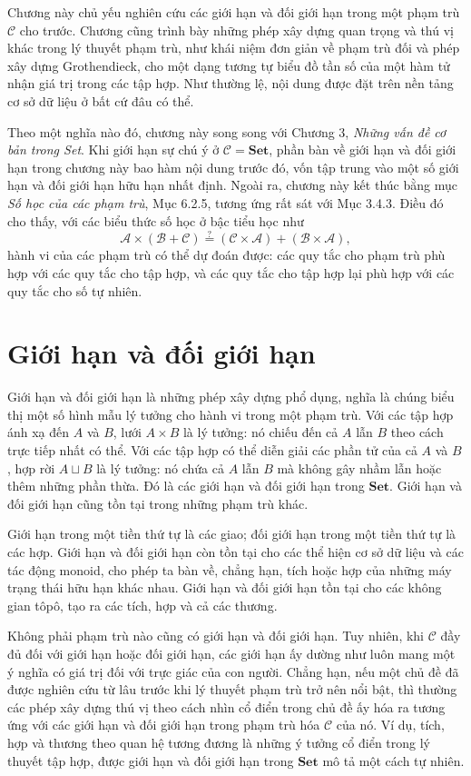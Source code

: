 Chương này chủ yếu nghiên cứu các giới hạn và đối giới hạn trong một phạm trù $\mathcal C$ cho trước. Chương cũng trình bày những phép xây dựng quan trọng và thú vị khác trong lý thuyết phạm trù, như khái niệm đơn giản về phạm trù đối và phép xây dựng Grothendieck, cho một dạng tương tự biểu đồ tần số của một hàm tử nhận giá trị trong các tập hợp. Như thường lệ, nội dung được đặt trên nền tảng cơ sở dữ liệu ở bất cứ đâu có thể.

Theo một nghĩa nào đó, chương này song song với Chương 3, \emph{Những vấn đề cơ bản trong Set}. Khi giới hạn sự chú ý ở $\mathcal C=\mathbf{Set}$, phần bàn về giới hạn và đối giới hạn trong chương này bao hàm nội dung trước đó, vốn tập trung vào một số giới hạn và đối giới hạn hữu hạn nhất định. Ngoài ra, chương này kết thúc bằng mục \emph{Số học của các phạm trù}, Mục 6.2.5, tương ứng rất sát với Mục 3.4.3. Điều đó cho thấy, với các biểu thức số học ở bậc tiểu học như
\[\mathcal A\times(\mathcal B+\mathcal C)\overset{?}{=}(\mathcal C\times\mathcal A)+(\mathcal B\times\mathcal A),\]
hành vi của các phạm trù có thể dự đoán được: các quy tắc cho phạm trù phù hợp với các quy tắc cho tập hợp, và các quy tắc cho tập hợp lại phù hợp với các quy tắc cho số tự nhiên.

\section{Giới hạn và đối giới hạn}
Giới hạn và đối giới hạn là những phép xây dựng phổ dụng, nghĩa là chúng biểu thị một số hình mẫu lý tưởng cho hành vi trong một phạm trù. Với các tập hợp ánh xạ đến $A$ và $B$, lưới $A\times B$ là lý tưởng: nó chiếu đến cả $A$ lẫn $B$ theo cách trực tiếp nhất có thể. Với các tập hợp có thể diễn giải các phần tử của cả $A$ và $B$, hợp rời $A\sqcup B$ là lý tưởng:
nó chứa cả $A$ lẫn $B$ mà không gây nhầm lẫn hoặc thêm những phần thừa. Đó là các giới hạn và đối giới hạn trong $\mathbf{Set}$. Giới hạn và đối giới hạn cũng tồn tại trong những phạm trù khác.

Giới hạn trong một tiền thứ tự là các giao; đối giới hạn trong một tiền thứ tự là các hợp. Giới hạn và đối giới hạn còn tồn tại cho các thể hiện cơ sở dữ liệu và các tác động monoid, cho phép ta bàn về, chẳng hạn, tích hoặc hợp của những máy trạng thái hữu hạn khác nhau. Giới hạn và đối giới hạn tồn tại cho các không gian tôpô, tạo ra các tích, hợp và cả các thương.

Không phải phạm trù nào cũng có giới hạn và đối giới hạn. Tuy nhiên, khi $\mathcal C$ đầy đủ đối với giới hạn hoặc đối giới hạn, các giới hạn ấy dường như luôn mang một ý nghĩa có giá trị đối với trực giác của con người. Chẳng hạn, nếu một chủ đề đã được nghiên cứu từ lâu trước khi lý thuyết phạm trù trở nên nổi bật, thì thường các phép xây dựng thú vị theo cách nhìn cổ điển trong chủ đề ấy hóa ra tương ứng với các giới hạn và đối giới hạn trong phạm trù hóa $\mathcal C$ của nó. Ví dụ, tích, hợp và thương theo quan hệ tương đương là những ý tưởng cổ điển trong lý thuyết tập hợp, được giới hạn và đối giới hạn trong $\mathbf{Set}$ mô tả một cách tự nhiên.

